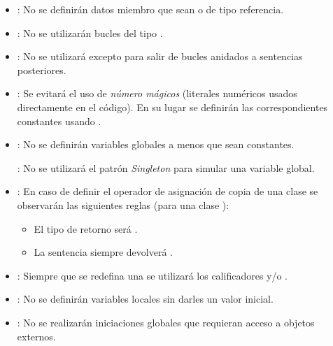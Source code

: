 \begin{itemize}

\item {}:
No se definirán datos miembro que sean  o de tipo referencia.

\item {}:
No se utilizarán bucles del tipo .

\item {}:
No se utilizará  excepto para salir de bucles anidados
a sentencias posteriores.

\item {}:
Se evitará el uso de \emph{número mágicos} (literales numéricos usados
directamente en el código). En su lugar se definirán las correspondientes
constantes usando .

\item {}:
No se definirán variables globales a menos que sean constantes.

: No se utilizará el patrón \emph{Singleton} para
simular una variable global.

\item {}:
En caso de definir el operador de asignación de copia de una clase 
se observarán las siguientes reglas (para una clase ):
  \begin{itemize}
    \item El tipo de retorno será .
    \item La sentencia  siempre devolverá .
  \end{itemize}

\item {}:
Siempre que se redefina una  se utilizará los
calificadores  y/o .

\item {}:
No se definirán variables locales sin darles un valor inicial.

\item {}:
No se realizarán iniciaciones globales que requieran acceso a objetos externos.


\end{itemize}
